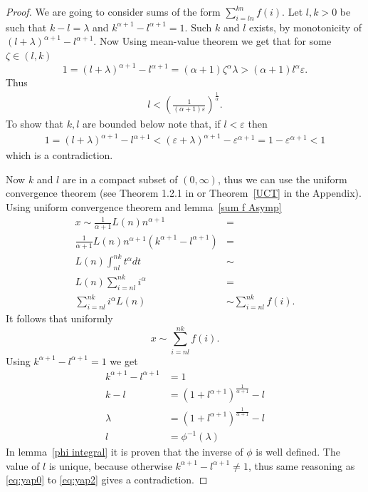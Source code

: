 \documentclass[10pt]{article}
\theoremstyle{plain}
\theoremstyle{definition}
\let\epsilon\varepsilon
\begin{document}
	\begin{proof}
		We are going to consider sums of the form $\sum_{i=ln}^{kn} f(i)$. Let $l,k>0$ be such that $k-l=\lambda$ and $k^{\alpha+1}-l^{\alpha+1}=1$. Such $k$ and $l$ exists, by monotonicity of $(l+\lambda)^{\alpha+1}-l^{\alpha+1}$. Now Using mean-value theorem we get that for some $\zeta\in(l, k)$
		\begin{equation}
			1=(l+\lambda)^{\alpha+1}-l^{\alpha+1}=(\alpha+1)\zeta^\alpha\lambda>(\alpha+1)l^\alpha\epsilon.
		\end{equation}
		Thus
		\begin{align}
			l<\left(\frac{1}{(\alpha+1)\epsilon}\right)^{\frac{1}{\alpha}}.
		\end{align}
		To show that $k,l$ are bounded below note that, if $l<\epsilon$ then
		\begin{align}
			1=(l+\lambda)^{\alpha+1}-l^{\alpha+1}<(\epsilon+\lambda)^{\alpha+1}-\epsilon^{\alpha+1}=1-\epsilon^{\alpha+1}<1
		\end{align}
		which is a contradiction.
		
		Now $k$ and $l$ are in a compact subset of $(0,\infty)$, thus we can use the uniform convergence theorem (see Theorem 1.2.1 in \cite{bingham1987regular} or Theorem~\ref{UCT} in the Appendix). Using uniform convergence theorem and lemma~\ref{sum f Asymp}
		\begin{align}
			x\sim\frac{1}{\alpha+1}L(n)n^{\alpha+1}&= \label{eq:yap0}\\
			\frac{1}{\alpha+1}L(n)n^{\alpha+1}(k^{\alpha+1}-l^{\alpha+1})&=\label{eq:yap1}\\
			L(n)\int_{nl}^{nk} t^\alpha dt&\sim\\
			L(n)\sum_{i=nl}^{nk} i^\alpha&=\\
			\sum_{i=nl}^{nk} i^\alpha L(n) &\sim \sum_{i=nl}^{nk} f(i).\label{eq:yap2}
		\end{align}
			It follows that uniformly
			\begin{equation}\label{x sim nk-nl sum}
				x\sim \sum_{i=nl}^{nk} f(i).
			\end{equation}
		Using $k^{\alpha+1}-l^{\alpha+1}=1$ we get
		\begin{align}
			k^{\alpha+1}-l^{\alpha+1}&= 1\\
			k-l&= (1+l^{\alpha+1})^{\frac{1}{\alpha+1}}-l\\
			\lambda&= (1+l^{\alpha+1})^{\frac{1}{\alpha+1}}-l\\
			l&=\phi^{-1}(\lambda)
		\end{align}
		In lemma~\ref{phi integral} it is proven that the inverse of $\phi$ is well defined. The value of $l$ is unique, because otherwise $k^{\alpha+1}-l^{\alpha+1}\neq 1$, thus same reasoning as \ref{eq:yap0} to \ref{eq:yap2} gives a contradiction.
		
	\end{proof}
	
\end{document}
